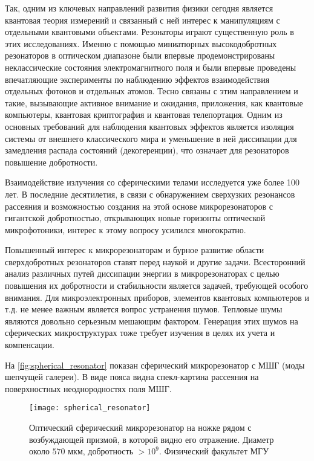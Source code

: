\documentclass[12pt,a4paper]{article}
\begin{document}
        Так, одним из ключевых направлений развития физики сегодня является квантовая теория измерений и связанный с ней интерес к манипуляциям с отдельными квантовыми объектами. Резонаторы играют существенную роль в этих исследованиях. Именно с помощью миниатюрных высокодобротных резонаторов в оптическом диапазоне были впервые продемонстрированы неклассические состояния электромагнитного поля и были впервые проведены впечатляющие эксперименты по наблюдению эффектов взаимодействия отдельных фотонов и отдельных атомов. Тесно связаны с этим направлением и такие, вызывающие активное внимание и ожидания, приложения, как квантовые компьютеры, квантовая криптография и квантовая телепортация. Одним из основных требований для наблюдения квантовых эффектов является изоляция системы от внешнего классического мира и уменьшение в ней диссипации для замедления распада состояний (декогеренции), что означает для резонаторов повышение добротности. \cite{microresonators}

        Взаимодействие излучения со сферическими телами исследуется уже более 100 лет. В последние десятилетия, в связи с обнаружением сверхузких резонансов рассеяния и возможностью создания на этой основе микрорезонаторов с гигантской добротностью, открывающих новые горизонты оптической микрофотоники, интерес к этому вопросу усилился многократно. \cite{microresonators}

        Повышенный интерес к микрорезонаторам и бурное развитие области сверхдобротных резонаторов ставят перед наукой и другие задачи. Всесторонний анализ различных путей диссипации энергии в микрорезонаторах с целью повышения их добротности и стабильности является задачей, требующей особого внимания. Для микроэлектронных приборов, элементов квантовых компьютеров и т.д. не менее важным является вопрос устранения шумов. Тепловые шумы являются довольно серьезным мешающим фактором. Генерация этих шумов на сферических микроструктурах тоже требует изучения в целях их учета и компенсации.

        На \autoref{fig:spherical_resonator} показан сферический микрорезонатор с МШГ (моды шепчущей галереи). В виде пояса видна спекл-картина рассеяния на поверхностных неоднородностях поля МШГ.
        \begin{figure}[h]
            \centering
            \texttt{[image: spherical\_resonator]}
            \caption[]{Оптический сферический микрорезонатор на ножке рядом с возбуждающей призмой, в которой видно его отражение. Диаметр около $570$ мкм, добротность $> 10^9$. Физический факультет МГУ \cite{microresonators}}
            \label{fig:spherical_resonator}
        \end{figure}


    \nocite{*}
    
    
\end{document}
